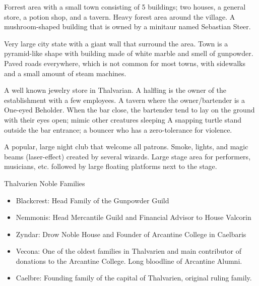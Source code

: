 Forrest area with a small town consisting of 5 buildings; two houses, a general store, a potion shop, and a tavern.
	Heavy forest area around the village. 
	A mushroom-shaped building that is owned by a minitaur named Sebastian Steer.

	Very large city state with a giant wall that surround the area.
	Town is a pyramid-like shape with building made of white marble and smell of gunpowder.
	Paved roads everywhere, which is not common for most towns, with sidewalks and a small amount of steam machines.


	A well known jewelry store in Thalvarian.
	A halfling is the owner of the establishment with a few employees.
	A tavern where the owner/bartender is a One-eyed Beholder.
	When the bar close, the bartender tend to lay on the ground with their eyes open; mimic other creatures sleeping
	A snapping turtle stand outside the bar entrance; a bouncer who has a zero-tolerance for violence.

	A popular, large night club that welcome all patrons.
	Smoke, lights, and magic beams (laser-effect) created by several wizards.
	Large stage area for performers, musicians, etc. followed by large floating platforms next to the stage.

\begin{DndSidebar}[float=!b]{Thalvarien Noble Families}
	\begin{itemize}
		\item[*]Blackcrest: Head Family of the Gunpowder Guild
		\item[*]Nemmonis: Head Mercantile Guild and Financial Advisor to House Valcorin
		\item[*]Zyndar: Drow Noble House and Founder of Arcantine College in Caelbaris
		\item[*]Vecona: One of the oldest families in Thalvarien and main contributor of donations to the Arcantine College. Long bloodline of Arcantine Alumni.
		\item[*]Caelbre: Founding family of the capital of Thalvarien, original ruling family.
	\end{itemize}
\end{DndSidebar}
